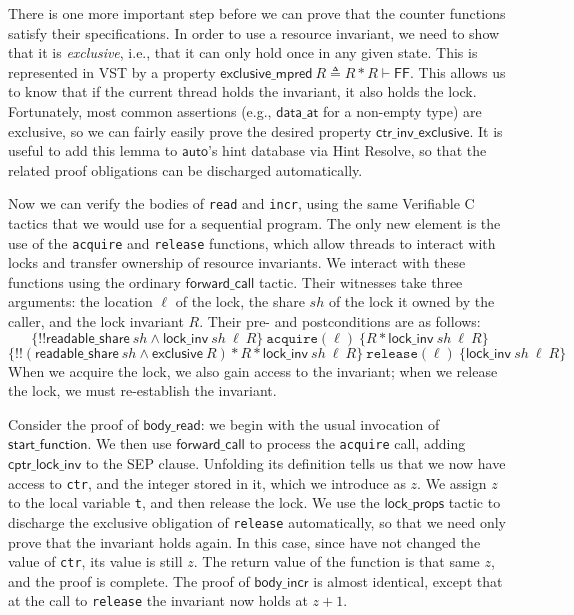 \documentclass[11pt]{article} %
\begin{document}
There is one more important step before we can prove that the counter functions satisfy their specifications. In order to use a resource invariant, we need to show that it is \emph{exclusive}, i.e., that it can only hold once in any given state. This is represented in VST by a property $\mathsf{exclusive\_mpred}\ R \triangleq R * R \vdash \mathsf{FF}$. This allows us to know that if the current thread holds the invariant, it also holds the lock. Fortunately, most common assertions (e.g., $\mathsf{data\_at}$ for a non-empty type) are exclusive, so we can fairly easily prove the desired property $\mathsf{ctr\_inv\_exclusive}$. It is useful to add this lemma to $\mathsf{auto}$'s hint database via \textsf{Hint Resolve}, so that the related proof obligations can be discharged automatically.

Now we can verify the bodies of \texttt{read} and \texttt{incr}, using the same Verifiable C tactics that we would use for a sequential program. The only new element is the use of the \texttt{acquire} and \texttt{release} functions, which allow threads to interact with locks and transfer ownership of resource invariants. We interact with these functions using the ordinary $\mathsf{forward\_call}$ tactic. Their witnesses take three arguments: the location $\ell$ of the lock, the share $\mathit{sh}$ of the lock it owned by the caller, and the lock invariant $R$. Their pre- and postconditions are as follows:
$$\{!!\mathsf{readable\_share}\ \mathit{sh} \land \mathsf{lock\_inv}\ \mathit{sh}\ \ell\ R\}\ \texttt{acquire}(\ell)\ \{R * \mathsf{lock\_inv}\ \mathit{sh}\ \ell\ R\}$$
$$\{!!(\mathsf{readable\_share}\ \mathit{sh} \land \mathsf{exclusive}\ R) * R * \mathsf{lock\_inv}\ \mathit{sh}\ \ell\ R\}\ \texttt{release}(\ell)\ \{\mathsf{lock\_inv}\ \mathit{sh}\ \ell\ R\}$$
When we acquire the lock, we also gain access to the invariant; when we release the lock, we must re-establish the invariant.

Consider the proof of $\mathsf{body\_read}$: we begin with the usual invocation of $\mathsf{start\_function}$. We then use $\mathsf{forward\_call}$ to process the \texttt{acquire} call, adding $\mathsf{cptr\_lock\_inv}$ to the \textsf{SEP} clause. Unfolding its definition tells us that we now have access to \texttt{ctr}, and the integer stored in it, which we introduce as $z$. We assign $z$ to the local variable \texttt{t}, and then release the lock. We use the $\mathsf{lock\_props}$ tactic to discharge the exclusive obligation of \texttt{release} automatically, so that we need only prove that the invariant holds again. In this case, since have not changed the value of \texttt{ctr}, its value is still $z$. The return value of the function is that same $z$, and the proof is complete. The proof of $\mathsf{body\_incr}$ is almost identical, except that at the call to \texttt{release} the invariant now holds at $z + 1$.
\end{document}
